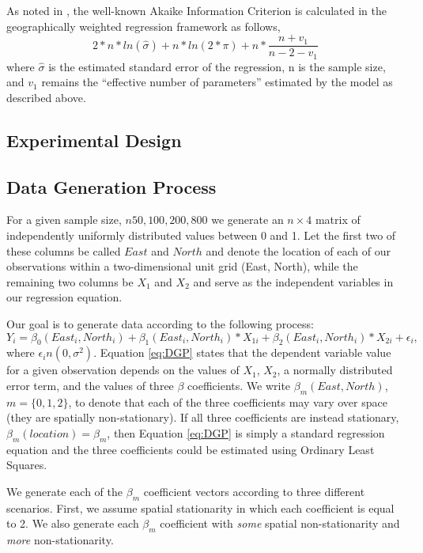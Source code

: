 \documentclass{article}\usepackage[]{graphicx}\usepackage[]{color}
\begin{document}
As noted in \citep{Fotheringham2002}, the well-known Akaike Information Criterion is calculated in the geographically weighted regression framework as follows,
\begin{equation}\label{eq:AIC}
  2*n*ln(\hat{\sigma}) + n*ln(2*\pi) + 
    n*\frac{n + v_1}{n - 2 - v_1}
    \end{equation}
where $\hat{\sigma}$ is the estimated standard error of the regression, n is the sample size, and $v_1$ remains the ``effective number of parameters'' estimated by the model as described above.

\subsection{Experimental Design}

\subsection{Data Generation Process}

For a given sample size, $n 50, 100, 200, 800$ we generate an $n \times 4$ matrix of independently uniformly distributed values between 0 and 1. Let the first two of these columns be called $East$ and $North$ and denote the location of each of our observations within a two-dimensional unit grid (East, North), while the remaining two columns be $X_1$ and $X_2$ and serve as the independent variables in our regression equation.


Our goal is to generate data according to the following process:
\begin{equation} \label{eq:DGP}
Y_i = \beta _0 (East_i, North_i) + \beta _1 (East_i, North_i)*X_{1i} + \beta _2 (East_i, North_i) * X_{2i} + \epsilon _i ,
\end{equation}
where $\epsilon _i n(0, \sigma ^2)$.
Equation \ref{eq:DGP} states that the dependent variable value for a given observation depends on the values of $X_1$, $X_2$, a normally distributed error term, and the values of three $\beta$ coefficients. We write $\beta _m (East, North)$, $m = \{0, 1, 2\}$, to denote that each of the three coefficients may vary over space (they are spatially non-stationary). If all three coefficients are instead stationary, $\beta _m(location) = \beta _m$, then Equation \ref{eq:DGP} is simply a standard regression equation and the three coefficients could be estimated using Ordinary Least Squares. 

We generate each of the $\beta _m$ coefficient vectors according to three different scenarios. First, we assume spatial stationarity in which each coefficient is equal to 2. We also generate each $\beta _m$ coefficient with \emph{some} spatial non-stationarity and \emph{more} non-stationarity. 
\end{document}
